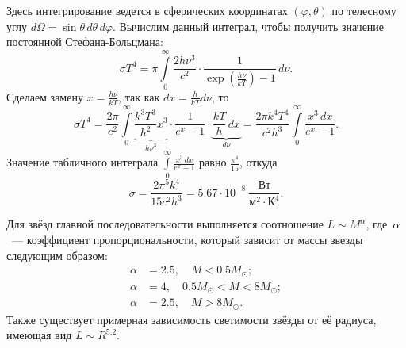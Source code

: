 Здесь интегрирование ведется в сферических координатах $(\varphi, \theta)$ по телесному углу $d\Omega = \sin \theta \,  d\theta \, d\varphi$. Вычислим данный интеграл, чтобы получить значение постоянной Стефана-Больцмана:
\begin{equation*}
    \sigma T^4 = \pi \int\limits_0^{\infty} \frac{2h\nu^3}{c^2}\cdot \frac{1}{\exp\left(\frac{h\nu}{kT}\right)-1} \,d \nu.
\end{equation*}
Сделаем замену $x = \frac{h \nu}{k T}$, так как $dx = \frac{h}{k T} d\nu$, то
\begin{equation*}
    \sigma T^4 = \frac{2\pi}{c^2}  \int\limits_0^{\infty} \underbrace{\frac{k^3 T^3}{h^2} x^3}_{h\nu^3} \cdot \frac{1}{e^x - 1} \cdot \underbrace{\frac{kT}{h} \,d x}_{d\nu} = \frac{2 \pi k^4 T^4}{c^2 h^3} \int\limits_0^{\infty} \frac{x^3 \,d x}{e^x - 1}.
\end{equation*}
Значение табличного интеграла $\int\limits_0^{\infty} \frac{x^3 \,d x}{e^x - 1}$ равно $\frac{\pi^4}{15}$, откуда
\begin{equation*}
    \sigma = \frac{2 \pi^5 k^4}{15 c^2 h^3} = 5.67 \cdot 10^{-8}~\frac{\text{Вт}}{\text{м}^2 \cdot \text{К}^4}.
\end{equation*}

Для звёзд главной последовательности выполняется соотношение $L \sim M^{\alpha}$, где~$\alpha$~--- коэффициент пропорциональности, который зависит от массы звезды следующим образом:
\begin{align*}
    \alpha &= 2.5,\quad M < 0.5 M_\odot; \\
    \alpha &= 4, \quad 0.5 M_\odot < M < 8 M_\odot;\\
    \alpha &= 2.5, \quad  M > 8 M_\odot.
\end{align*}
Также существует примерная зависимость светимости звёзды от её радиуса, имеющая вид  $L\sim R^{5.2}$.
